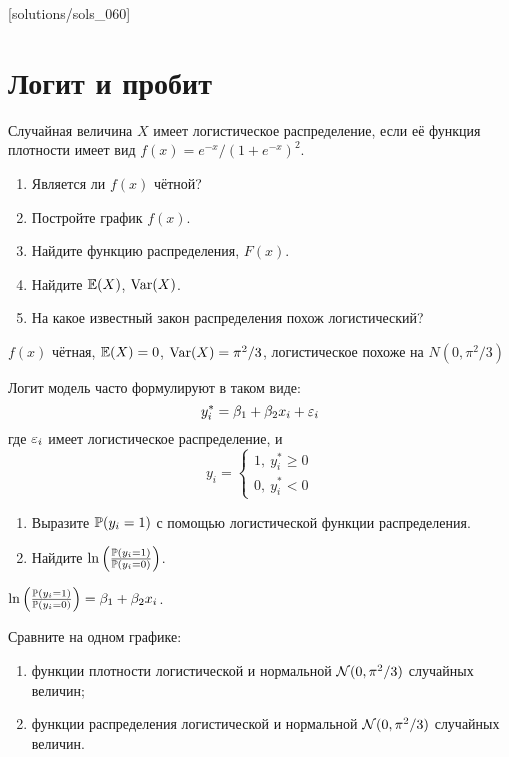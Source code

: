 [solutions/sols_060]



\chapter{Логит и пробит}




\begin{problem}
Случайная величина $X$ имеет логистическое распределение, если её функция плотности имеет вид $f(x)=e^{-x}/(1+e^{-x})^2$.
\begin{enumerate}
\item Является ли $f(x)$ чётной?
\item Постройте график $f(x)$.
\item Найдите функцию распределения, $F(x)$.
\item Найдите $\E(X)$, $\Var(X)$.
\item На какое известный закон распределения похож логистический?
\end{enumerate}


\begin{sol}
$f(x)$ чётная, $\E(X)=0$, $\Var(X)=\pi^2/3$, логистическое похоже на $N(0,\pi^2/3)$
\end{sol}
\end{problem}



\begin{problem}
Логит модель часто формулируют в таком виде:
\[
y_i^*=\beta_1+\beta_2 x_i +\e_i
\]
где $\e_i$ имеет логистическое распределение, и
\[
y_i=\begin{cases}
1,\: y_i^*\geq 0 \\
0,\: y_i^*<0
\end{cases}
\]
\begin{enumerate}
\item Выразите $\P(y_i=1)$ с помощью логистической функции распределения.
\item Найдите $\ln \left(\frac{\P(y_i=1)}{\P(y_i=0)} \right)$.
\end{enumerate}


\begin{sol}
$\ln \left(\frac{\P(y_i=1)}{\P(y_i=0)} \right)=\beta_1+\beta_2 x_i$.
\end{sol}
\end{problem}



\begin{problem}
\useR Сравните на одном графике:
\begin{enumerate}
\item функции плотности логистической и нормальной $\cN(0,\pi^2/3)$ случайных величин;
\item функции распределения логистической и нормальной $\cN(0,\pi^2/3)$ случайных величин.
\end{enumerate}

\begin{sol}
\end{sol}
\end{problem}



